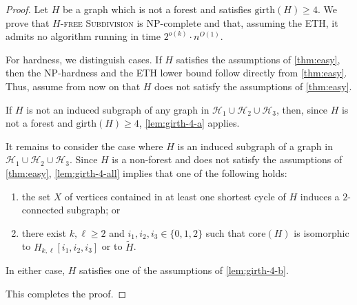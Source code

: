 \documentclass[a4paper,UKenglish,cleveref, autoref, thm-restate]{lipics-v2021}
\newcommand{\girth}{\mathrm{girth}}
\newcommand{\core}{\mathrm{core}}
\begin{document}
\begin{proof}
Let $H$ be a graph which is not a forest and satisfies $\girth(H)\geq 4$.
We prove that \textsc{$H$-free Subdivision} is NP-complete and that, assuming the ETH, it admits no algorithm running in time
$2^{o(k)}\cdot n^{O(1)}$.


For hardness, we distinguish cases.
If $H$ satisfies the assumptions of \cref{thm:easy}, then the NP-hardness and the ETH lower bound follow directly from \cref{thm:easy}.
Thus, assume from now on that $H$ does not satisfy the assumptions of \cref{thm:easy}.

If $H$ is not an induced subgraph of any graph in
$\mathcal H_1\cup \mathcal H_2\cup \mathcal H_3$, then, since $H$ is not a forest and $\girth(H)\geq 4$, \cref{lem:girth-4-a} applies.

It remains to consider the case where $H$ is an induced subgraph of a graph in
$\mathcal H_1\cup \mathcal H_2\cup \mathcal H_3$.
Since $H$ is a non-forest and does not satisfy the assumptions of \cref{thm:easy}, \cref{lem:girth-4-all} implies that one of the following holds:
\begin{enumerate}[(1)]
    \item the set $X$ of vertices contained in at least one shortest cycle of $H$ induces a $2$-connected subgraph; or
    \item there exist $k,\ell\geq 2$ and $i_1,i_2,i_3\in\{0,1,2\}$ such that
    $\core(H)$ is isomorphic to $H_{k,\ell}[i_1,i_2,i_3]$ or to $\widetilde H$.
\end{enumerate}
In either case, $H$ satisfies one of the assumptions of \cref{lem:girth-4-b}.

This completes the proof.
\end{proof}
\end{document}
